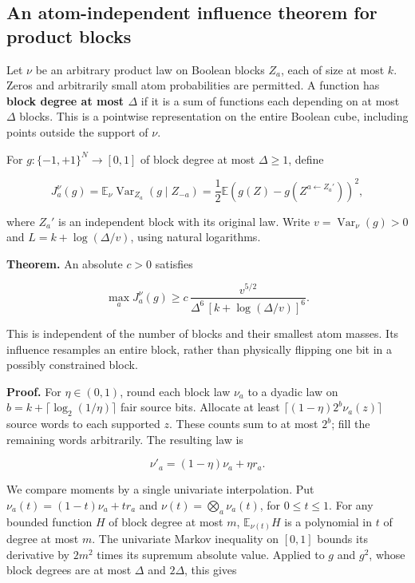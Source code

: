 \subsection{An atom-independent influence theorem for product
blocks}\label{influence-recovery:an-atom-independent-influence-theorem-for-product-blocks}

Let \(\nu\) be an arbitrary product law on Boolean blocks \(Z_a\), each
of size at most \(k\). Zeros and arbitrarily small atom probabilities
are permitted. A function has \textbf{block degree at most \(\Delta\)}
if it is a sum of functions each depending on at most \(\Delta\) blocks.
This is a pointwise representation on the entire Boolean cube, including
points outside the support of \(\nu\).

For \(g:\{-1,+1\}^N\to[0,1]\) of block degree at most \(\Delta\ge1\),
define

\[
 J_a^\nu(g)=\mathbb E_\nu\operatorname{Var}_{Z_a}
                      (g\mid Z_{-a})
 =\frac12\mathbb E(g(Z)-g(Z^{a\leftarrow Z_a'}))^2,
 \tag{B1}
\]

where \(Z_a'\) is an independent block with its original law. Write
\(v=\operatorname{Var}_\nu(g)>0\) and \(L=k+\log(\Delta/v)\), using
natural logarithms.

\textbf{Theorem.} An absolute \(c>0\) satisfies

\[
 \boxed{\quad
 \max_a J_a^\nu(g)
 \ge c\,\frac{v^{5/2}}
 {\Delta^6\,[k+\log(\Delta/v)]^6}.
 \quad} \tag{B2}
\]

This is independent of the number of blocks and their smallest atom
masses. Its influence resamples an entire block, rather than physically
flipping one bit in a possibly constrained block.

\textbf{Proof.} For \(\eta\in(0,1)\), round each block law \(\nu_a\) to
a dyadic law on \(b=k+\lceil\log_2(1/\eta)\rceil\) fair source bits.
Allocate at least \(\lceil(1-\eta)2^b\nu_a(z)\rceil\) source words to
each supported \(z\). These counts sum to at most \(2^b\); fill the
remaining words arbitrarily. The resulting law is

\[
 \nu'_a=(1-\eta)\nu_a+\eta r_a.
 \tag{B3}
\]

We compare moments by a single univariate interpolation. Put
\(\nu_a(t)=(1-t)\nu_a+t r_a\) and \(\nu(t)=\bigotimes_a\nu_a(t)\), for
\(0\le t\le1\). For any bounded function \(H\) of block degree at most
\(m\), \(\mathbb E_{\nu(t)}H\) is a polynomial in \(t\) of degree at
most \(m\). The univariate Markov inequality on \([0,1]\) bounds its
derivative by \(2m^2\) times its supremum absolute value. Applied to
\(g\) and \(g^2\), whose block degrees are at most \(\Delta\) and
\(2\Delta\), this gives

